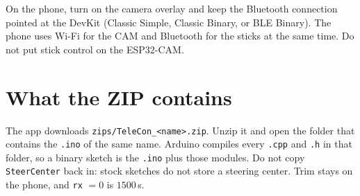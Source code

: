 \documentclass[12pt,a4paper]{article}
\begin{document}
On the phone, turn on the camera overlay and keep the Bluetooth connection
pointed at the DevKit (Classic Simple, Classic Binary, or BLE Binary).
The phone uses Wi-Fi for the CAM and Bluetooth for the sticks at the same
time. Do not put stick control on the ESP32-CAM.

\section{What the ZIP contains}

The app downloads \texttt{zips/TeleCon\_<name>.zip}. Unzip it and open the
folder that contains the \texttt{.ino} of the same name. Arduino compiles
every \texttt{.cpp} and \texttt{.h} in that folder, so a binary sketch is
the \texttt{.ino} plus those modules. Do not copy \texttt{SteerCenter}
back in: stock sketches do not store a steering center. Trim stays on the
phone, and \texttt{rx} $= 0$ is $1500$\,\textmu s.
\end{document}
